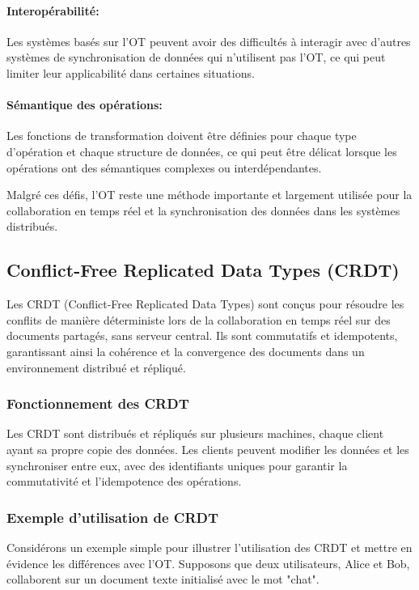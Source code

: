 \paragraph{Interopérabilité:} Les systèmes basés sur l'OT peuvent avoir des difficultés à interagir avec d'autres systèmes de synchronisation de données qui n'utilisent pas l'OT, ce qui peut limiter leur applicabilité dans certaines situations.
\paragraph{Sémantique des opérations:} Les fonctions de transformation doivent être définies pour chaque type d'opération et chaque structure de données, ce qui peut être délicat lorsque les opérations ont des sémantiques complexes ou interdépendantes.

Malgré ces défis, l'OT reste une méthode importante et largement utilisée pour la collaboration en temps réel et la synchronisation des données dans les systèmes distribués.

\subsection{Conflict-Free Replicated Data Types (CRDT)}
Les CRDT (Conflict-Free Replicated Data Types) sont conçus pour résoudre les conflits de manière déterministe lors de la collaboration en temps réel sur des documents partagés, sans serveur central. Ils sont commutatifs et idempotents, garantissant ainsi la cohérence et la convergence des documents dans un environnement distribué et répliqué.

\subsubsection{Fonctionnement des CRDT}
Les CRDT sont distribués et répliqués sur plusieurs machines, chaque client ayant sa propre copie des données. Les clients peuvent modifier les données et les synchroniser entre eux, avec des identifiants uniques pour garantir la commutativité et l'idempotence des opérations.

\subsubsection{Exemple d'utilisation de CRDT}
Considérons un exemple simple pour illustrer l'utilisation des CRDT et mettre en évidence les différences avec l'OT. Supposons que deux utilisateurs, Alice et Bob, collaborent sur un document texte initialisé avec le mot "chat".

